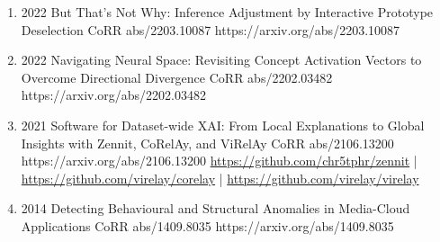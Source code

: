 {\begin{enumerate}
        \item {}
                        {2022}
                        {But That's Not Why: Inference Adjustment by Interactive Prototype Deselection}
                        {CoRR abs/2203.10087}
                        {https://arxiv.org/abs/2203.10087}

        \item {}
                        {2022}
                        {Navigating Neural Space: Revisiting Concept Activation Vectors to Overcome Directional Divergence}
                        {CoRR abs/2202.03482}
                        {https://arxiv.org/abs/2202.03482}

        \item {}
                        {2021}
                        {Software for Dataset-wide XAI: From Local Explanations to Global Insights with Zennit, CoRelAy, and ViRelAy}
                        {CoRR abs/2106.13200}
                        {https://arxiv.org/abs/2106.13200}
                        {   \href{https://github.com/chr5tphr/zennit}{https://github.com/chr5tphr/zennit} | \\
                            \href{https://github.com/virelay/corelay}{https://github.com/virelay/corelay} |
                            \href{https://github.com/virelay/virelay}{https://github.com/virelay/virelay}
                        }

        \item {}
                        {2014}
                        {Detecting Behavioural and Structural Anomalies in Media-Cloud Applications}
                        {CoRR abs/1409.8035}
                        {https://arxiv.org/abs/1409.8035}

    \end{enumerate}

}
